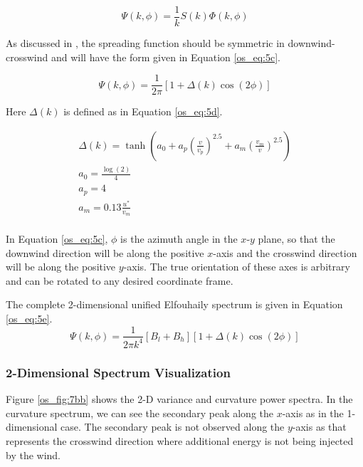 \begin{equation}
\label{os_eq:5b}
\Psi(k,\phi) = \frac{1}{k}S(k)\Phi(k,\phi)
\end{equation}
\renewcommand{\baselinestretch}{2} \small\normalsize

As discussed in \cite{elfouhaily}, the spreading function should be symmetric in downwind-crosswind and will have the form given in Equation \ref{os_eq:5c}.

\begin{equation}
\label{os_eq:5c}
\Psi(k,\phi) = \frac{1}{2\pi}\left[1 + \Delta(k)\cos(2\phi) \right]
\end{equation}
\renewcommand{\baselinestretch}{2} \small\normalsize

\noindent Here $\Delta(k)$ is defined as in Equation \ref{os_eq:5d}.

\begin{equation}
\label{os_eq:5d}
\begin{gathered}
\Delta(k) = \tanh\left( a_0 + a_p\left(\frac{v}{v_p}\right)^{2.5}  + a_m\left(\frac{v_m}{v} \right)^{2.5}\right)\\
a_0 = \frac{\log(2)}{4} \\
a_p = 4\\
a_m = 0.13\frac{u^*}{v_m} \\
\end{gathered}
\end{equation}
\renewcommand{\baselinestretch}{2} \small\normalsize

In Equation \ref{os_eq:5c}, $\phi$ is the azimuth angle in the $x$-$y$ plane, so that the downwind direction will be along the positive $x$-axis and the crosswind direction will be along the positive $y$-axis. The true orientation of these axes is arbitrary and can be rotated to any desired coordinate frame.

The complete 2-dimensional unified Elfouhaily spectrum is given in Equation \ref{os_eq:5e}.
\begin{equation}
\label{os_eq:5e}
\boxed{\Psi(k,\phi) = \frac{1}{2\pi k^4}\left[B_l + B_h \right] \left[1 + \Delta(k)\cos(2\phi) \right]}
\end{equation}

\subsubsection{2-Dimensional Spectrum Visualization}
Figure \ref{os_fig:7bb} shows the 2-D variance and curvature power spectra. In the curvature spectrum, we can see the secondary peak along the $x$-axis as in the 1-dimensional case. The secondary peak is not observed along the $y$-axis as that represents the crosswind direction where additional energy is not being injected by the wind.

